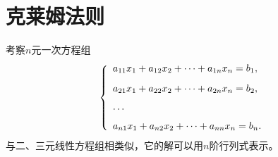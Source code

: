 \section{克莱姆法则}
考察$n$元一次方程组
\begin{equation}\label{ls}
  \left\{
    \begin{array}{l}
      a_{11}x_1 + a_{12}x_2 + \cdots + a_{1n}x_n = b_1, \\[0.3cm]
      a_{21}x_1 + a_{22}x_2 + \cdots + a_{2n}x_n = b_2, \\[0.3cm]
      \cdots \\[0.2cm]
      a_{n1}x_1 + a_{n2}x_2 + \cdots + a_{nn}x_n = b_n.
    \end{array}
  \right.
\end{equation}
与二、三元线性方程组相类似，它的解可以用$n$阶行列式表示。

